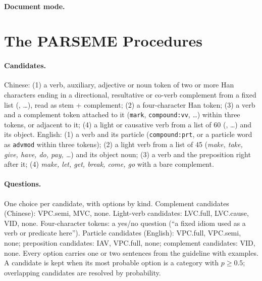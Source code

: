 \paragraph{Document mode.} 

\section{The PARSEME Procedures}
\label{app:parseme}
\paragraph{Candidates.} Chinese: (1) a verb, auxiliary, adjective or noun token of two or more Han characters ending in a directional, resultative or co-verb complement from a fixed list (, \dots), read as stem + complement; (2) a four-character Han token; (3) a verb and a complement token attached to it (\texttt{mark}, \texttt{compound:vv}, \dots) within three tokens, or adjacent to it; (4) a light or causative verb from a list of 60 (, \dots) and its object. English: (1) a verb and its particle (\texttt{compound:prt}, or a particle word as \texttt{advmod} within three tokens); (2) a light verb from a list of 45 (\emph{make, take, give, have, do, pay, \dots}) and its object noun; (3) a verb and the preposition right after it; (4) \emph{make, let, get, break, come, go} with a bare complement.

\paragraph{Questions.} One choice per candidate, with options by kind. Complement candidates (Chinese): VPC.semi, MVC, none. Light-verb candidates: LVC.full, LVC.cause, VID, none. Four-character tokens: a yes/no question (``a fixed idiom used as a verb or predicate here''). Particle candidates (English): VPC.full, VPC.semi, none; preposition candidates: IAV, VPC.full, none; complement candidates: VID, none. Every option carries one or two sentences from the guideline with examples. A candidate is kept when its most probable option is a category with $p \geq 0.5$; overlapping candidates are resolved by probability.

